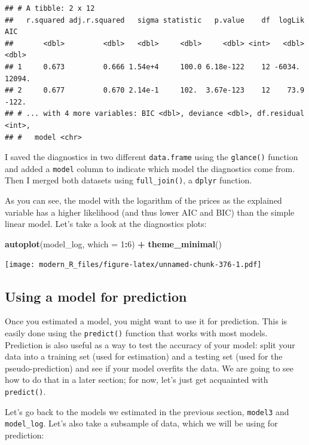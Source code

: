\documentclass[]{gitbook}
\newenvironment{Shaded}{\begin{snugshade}}{\end{snugshade}}
\newcommand{\DataTypeTok}[1]{\textcolor[rgb]{0.13,0.29,0.53}{#1}}
\newcommand{\DecValTok}[1]{\textcolor[rgb]{0.00,0.00,0.81}{#1}}
\newcommand{\KeywordTok}[1]{\textcolor[rgb]{0.13,0.29,0.53}{\textbf{#1}}}
\newcommand{\NormalTok}[1]{#1}
\newcommand{\OperatorTok}[1]{\textcolor[rgb]{0.81,0.36,0.00}{\textbf{#1}}}
\newcommand{\StringTok}[1]{\textcolor[rgb]{0.31,0.60,0.02}{#1}}
\theoremstyle{definition}
\theoremstyle{definition}
\theoremstyle{definition}
\theoremstyle{remark}
\begin{document}
\begin{verbatim}
## # A tibble: 2 x 12
##   r.squared adj.r.squared   sigma statistic   p.value    df  logLik     AIC
##       <dbl>         <dbl>   <dbl>     <dbl>     <dbl> <int>   <dbl>   <dbl>
## 1     0.673         0.666 1.54e+4     100.0 6.18e-122    12 -6034.   12094.
## 2     0.677         0.670 2.14e-1     102.  3.67e-123    12    73.9   -122.
## # ... with 4 more variables: BIC <dbl>, deviance <dbl>, df.residual <int>,
## #   model <chr>
\end{verbatim}

I saved the diagnostics in two different \texttt{data.frame} using the
\texttt{glance()} function and added a \texttt{model} column to indicate
which model the diagnostics come from. Then I merged both datasets using
\texttt{full\_join()}, a \texttt{dplyr} function.

As you can see, the model with the logarithm of the prices as the
explained variable has a higher likelihood (and thus lower AIC and BIC)
than the simple linear model. Let's take a look at the diagnostics
plots:

\begin{Shaded}
\begin{Highlighting}[]
\KeywordTok{autoplot}\NormalTok{(model_log, }\DataTypeTok{which =} \DecValTok{1}\OperatorTok{:}\DecValTok{6}\NormalTok{) }\OperatorTok{+}\StringTok{ }\KeywordTok{theme_minimal}\NormalTok{()}
\end{Highlighting}
\end{Shaded}

\texttt{[image: modern\_R\_files/figure-latex/unnamed-chunk-376-1.pdf]}

\hypertarget{using-a-model-for-prediction}{%
\subsection{Using a model for
prediction}\label{using-a-model-for-prediction}}

Once you estimated a model, you might want to use it for prediction.
This is easily done using the \texttt{predict()} function that works
with most models. Prediction is also useful as a way to test the
accuracy of your model: split your data into a training set (used for
estimation) and a testing set (used for the pseudo-prediction) and see
if your model overfits the data. We are going to see how to do that in a
later section; for now, let's just get acquainted with
\texttt{predict()}.

Let's go back to the models we estimated in the previous section,
\texttt{model3} and \texttt{model\_log}. Let's also take a subsample of
data, which we will be using for prediction:
\end{document}
